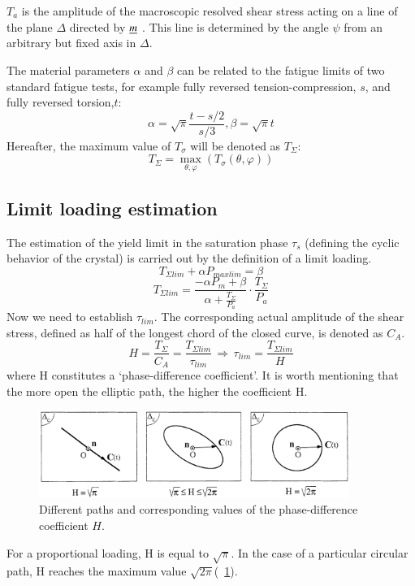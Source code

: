 \documentclass[3p,times,procedia,number]{elsarticle}
\newcommand{\figref}[1]{\figurename~\ref{#1}}
\begin{document}
$T_a$ is the amplitude of the macroscopic resolved shear
stress acting on a line of the plane $\Delta$ directed by $\uline{m}$ . This
line is determined by the angle $\psi$ from an arbitrary but
fixed axis in $\Delta$. 

The material parameters $\alpha$ and $\beta$ can be related to the
fatigue limits of two standard fatigue tests, for example
fully reversed tension-compression, $s$, and fully reversed
torsion,$t$:
\begin{equation}
\alpha=\sqrt{\pi}\frac{t-s/2}{s/3}, \beta=\sqrt{\pi}t
\end{equation}
Hereafter, the maximum value of $T_\sigma$ will be denoted as $T_\Sigma$:
\begin{equation}
T_\Sigma=\max\limits_{\theta,\varphi}(T_\sigma(\theta,\varphi))
\end{equation}


\subsection{Limit loading estimation}
The estimation of the yield limit in the saturation phase $\tau_s$ (defining the cyclic behavior of the crystal) is
carried out by the definition of a limit loading.
\begin{equation}
T_{\Sigma lim}+\alpha P_{max lim}=\beta
\end{equation}
\begin{equation}
T_{\Sigma lim}=\frac{-\alpha P_m+\beta}{\alpha+\frac{T_\Sigma}{P_a}}\cdot\frac{T_\Sigma}{P_a}
\label{Tlim}
\end{equation}
Now we need to establish $\tau_{lim}$. The corresponding actual amplitude of the shear stress,
defined as half of the longest chord of the closed curve, is denoted as $C_A$.
\begin{equation}
H=\frac{T_{\Sigma}}{C_A}=\frac{T_{\Sigma lim}}{\tau_{lim}} \, \Rightarrow \, \tau_{lim}=\frac{T_{\Sigma lim}}{H}
\label{eqH}
\end{equation}
where H constitutes a ‘phase-difference coefficient’.
It is worth mentioning that the more open the elliptic
path, the higher the coefficient H. 

\begin{figure}[h!]
	\centering
	\includegraphics[width=0.9\textwidth]{figures//H.png} 
	\caption{Different paths and corresponding values of the phase-difference coefficient $H$.}
	\label{figH}
\end{figure}
For a proportional
loading, H is equal to $\sqrt{\pi}$. In the case of a particular
circular path, H reaches the maximum value $\sqrt{2\pi}$(\figref{figH}). 
\end{document}
